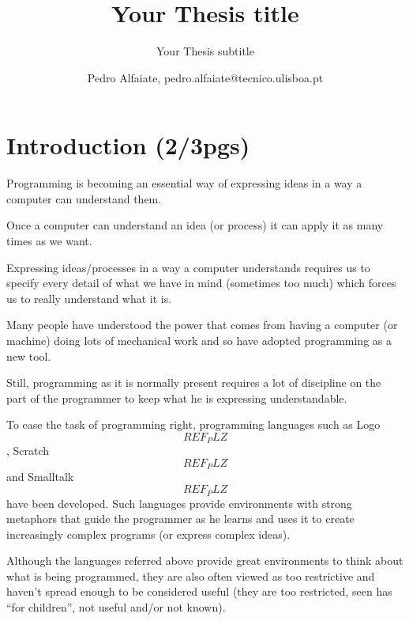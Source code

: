 \documentclass{./llncs2e/llncs}
\begin{document}
\title{Your Thesis title}

\subtitle{Your Thesis subtitle}
\author{Pedro Alfaiate, pedro.alfaiate@tecnico.ulisboa.pt}

\maketitle

\begin{abstract}

\end{abstract}
\begin{keywords}

\end{keywords}
\section{Introduction (2/3pgs)}
Programming is becoming an essential way of expressing ideas in a way a computer can understand them.

Once a computer can understand an idea (or process) it can apply it as many times as we want.

Expressing ideas/processes in a way a computer understands requires us to specify every detail of what we have in mind (sometimes too much) which forces us to really understand what it is.

Many people have understood the power that comes from having a computer (or machine) doing lots of mechanical work and so have adopted programming as a new tool.

Still, programming as it is normally present requires a lot of discipline on the part of the programmer to keep what he is expressing understandable.

To ease the task of programming right, programming languages such as Logo\[REF_PLZ\], Scratch\[REF_PLZ\] and Smalltalk\[REF_PLZ\] have been developed. Such languages provide environments with strong metaphors that guide the programmer as he learns and uses it to create increasingly complex programs (or express complex ideas).

Although the languages referred above provide great environments to think about what is being programmed, they are also often viewed as too restrictive and haven't spread enough to be considered useful (they are too restricted, seen has ``for children'', not useful and/or not known).
\end{document}

